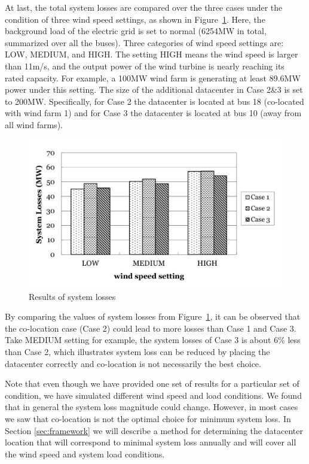 At last, the total system losses are compared over the three cases under the condition of three wind speed settings, as shown in Figure~\ref{fig:loss-cases}.  Here, the background load of the electric grid is set to normal (6254MW in total, summarized over all the buses). Three categories of wind speed settings are: LOW, MEDIUM, and HIGH. The setting HIGH means the wind speed is larger than 11m/s, and the output power of the wind turbine is nearly reaching its rated capacity. For example, a 100MW wind farm is generating at least 89.6MW power under this setting. The size of the additional datacenter in Case 2\&3 is set to 200MW. Specifically, for Case 2 the datacenter is located at bus 18 (co-located with wind farm 1) and for Case 3 the datacenter is located at bus 10 (away from all wind farms). %

\begin{figure}[hb]
\centering
\includegraphics[width=1\columnwidth]{img/loss3cases.pdf}
\caption{Results of system losses}%
\label{fig:loss-cases}
\end{figure}

By comparing the values of system losses
from Figure~\ref{fig:loss-cases}, it can be observed that the co-location case (Case 2) could lead to more losses than Case 1 and Case 3. Take MEDIUM setting for example, the system losses of Case 3 is about 6\% less than Case 2, which illustrates system loss can be reduced by placing the datacenter correctly and co-location is not necessarily the best choice.


Note that even though we have provided one set of results for a particular set of condition, we have simulated different wind speed and load conditions. We found that in general the system loss magnitude could change. However, in most cases we saw that co-location is not the optimal choice for minimum system loss. In Section \ref{sec:framework} we will describe a method for determining the datacenter location that will correspond to minimal system loss annually and will cover all the wind speed and system load conditions.



